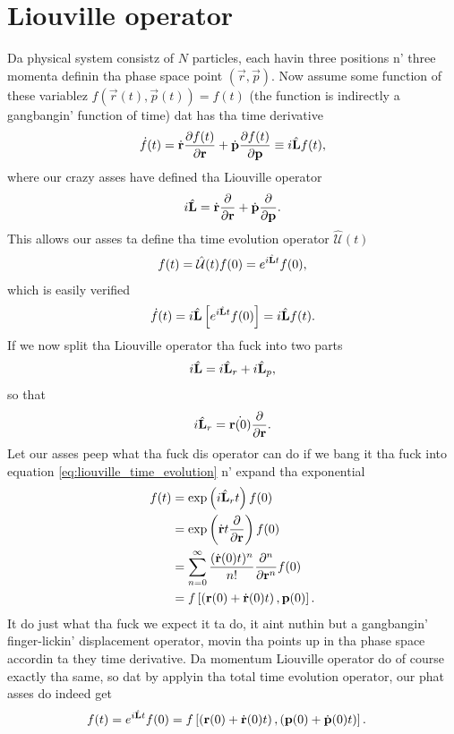 \section{Liouville operator}
\label{sec:liouville_operator}
Da physical system consistz of $N$ particles, each havin three positions n' three momenta definin tha phase space point $(\vec r, \vec p)$. Now assume some function of these variablez $f(\vec r(t), \vec p(t)) = f(t)$ (the function is indirectly a gangbangin' function of time) dat has tha time derivative
\begin{align}
	\dot f(t) = \dot {\mathbf r}\frac{\partial f(t)}{\partial \mathbf r} + \dot {\mathbf p}\frac{\partial f(t)}{\partial \mathbf p} \equiv i\hat{\mathbf L} f(t),
\end{align}
where our crazy asses have defined tha Liouville operator
\begin{align}
	i\hat{\mathbf L} = \dot{\mathbf r}\frac{\partial }{\partial \mathbf r} + \dot{\mathbf p}\frac{\partial }{\partial \mathbf p}.
\end{align}
This allows our asses ta define tha time evolution operator $\hat{\mathcal U}(t)$
\begin{align}
	\label{eq:liouville_time_evolution}
	f(t) = \hat{\mathcal U}(t)f(0) = e^{i\hat{\mathbf L} t}f(0),
\end{align}
which is easily verified
\begin{align}
	\dot f(t) = i\hat{\mathbf L} \left[e^{i\hat{\mathbf L} t}f(0)\right] = i\hat{\mathbf L} f(t).
\end{align}
If we now split tha Liouville operator tha fuck into two parts
\begin{align}
	i\hat{\mathbf L} = i\hat{\mathbf L}_r + i\hat{\mathbf L}_p,
\end{align}
so that
\begin{align}
	i\hat{\mathbf L}_r = \dot{\mathbf r(0)}\frac{\partial }{\partial \mathbf r}.
\end{align}
Let our asses peep what tha fuck dis operator can do if we bang it tha fuck into equation \eqref{eq:liouville_time_evolution} n' expand tha exponential
\begin{align}
	f(t) &= \exp\left(i\hat{\mathbf L}_r t\right) f(0)\\
	&= \exp\left(\dot{\mathbf r}t\frac{\partial }{\partial \mathbf r}\right)f(0)\\
	&= \sum_{n=0}^\infty \frac{(\dot{\mathbf r}(0)t)^n}{n!}\frac{\partial^n}{\partial \mathbf r^n} f(0)\\
	&= f\left[\left(\mathbf r(0) + \dot{\mathbf r}(0)t\right), \mathbf p(0)\right].
\end{align}
It do just what tha fuck we expect it ta do, it aint nuthin but a gangbangin' finger-lickin' displacement operator, movin tha points up in tha phase space accordin ta they time derivative. Da momentum Liouville operator do of course exactly tha same, so dat by applyin tha total time evolution operator, our phat asses do indeed get
\begin{align}
	f(t) &= e^{i\hat{\mathbf L} t}f(0) = f\left[\left(\mathbf r(0) + \dot{\mathbf r}(0)t\right), \left(\mathbf p(0) + \dot{\mathbf p}(0)t\right)\right].
\end{align}

